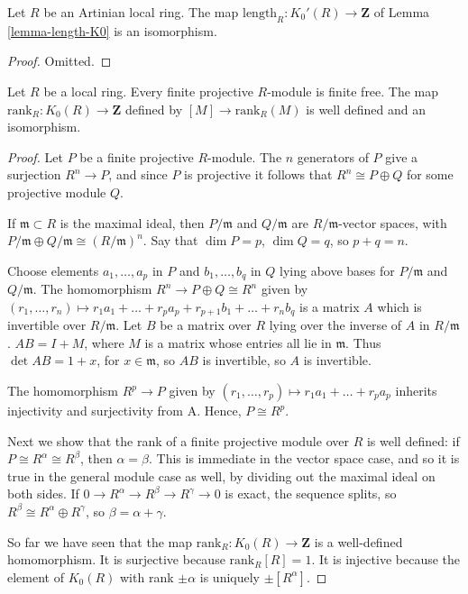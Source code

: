 \begin{lemma}
\label{lemma-K0prime-Artinian}
Let $R$ be an Artinian local ring.
The map $\text{length}_R : K_0'(R) \to \mathbf{Z}$
of Lemma \ref{lemma-length-K0} is an isomorphism.
\end{lemma}

\begin{proof}
Omitted.
\end{proof}

\begin{lemma}
\label{lemma-K0-local}
Let $R$ be a local ring. Every finite projective $R$-module
is finite free. The map $\text{rank}_R : K_0(R) \to \mathbf{Z}$
defined by $[M] \to \text{rank}_R(M)$ is well defined
and an isomorphism.
\end{lemma}

\begin{proof}
Let $P$ be a finite projective $R$-module.
The $n$ generators of $P$ give a surjection
$R^n \to P$, and since $P$ is projective it
follows that $R^n \cong P \oplus Q$ for some
projective module $Q$.

\medskip\noindent
If $\mathfrak m \subset R$ is the maximal ideal,
then $P/\mathfrak m$ and $Q/\mathfrak m$ are $R/\mathfrak m$-vector spaces,
with $P/\mathfrak m \oplus Q/\mathfrak m \cong (R/\mathfrak m)^n$.
Say that $\dim P = p$, $\dim Q = q$, so $p + q = n$.

\medskip\noindent
Choose elements $a_1, \ldots, a_p$ in $P$ and $b_1, \ldots, b_q$ in $Q$
lying above bases for $P/\mathfrak m$ and $Q/\mathfrak m$.
The homomorphism $R^n \to P \oplus Q \cong R^n$ given by
$(r_1, \ldots, r_n) \mapsto
r_1a_1 + \ldots + r_pa_p + r_{p + 1} b_1 + \ldots + r_nb_q$
is a matrix $A$ which is invertible over $R/\mathfrak m$. Let $B$
be a matrix over $R$ lying over the inverse of $A$ in $R/\mathfrak m$.
$AB = I + M$, where $M$ is a matrix whose entries all lie in $\mathfrak m$.
Thus $\det AB = 1 + x$, for $x \in \mathfrak m$, so $AB$ is invertible,
so $A$ is invertible.

\medskip\noindent
The homomorphism $R^p \to P$ given by
$(r_1, \ldots, r_p) \mapsto r_1a_1 + \ldots + r_pa_p$ inherits injectivity and
surjectivity from A. Hence, $P \cong R^p$.

\medskip\noindent
Next we show that the rank of a finite projective module over $R$ is
well defined: if $P \cong R^\alpha \cong R^\beta$, then $\alpha = \beta$.
This is immediate in the vector space case, and so it is true in the
general module case as well, by dividing out the maximal ideal on both sides.
If $0 \to R^\alpha \to R^\beta \to R^\gamma \to 0$
is exact, the sequence splits, so $R^\beta \cong R^\alpha \oplus R^\gamma$,
so $\beta = \alpha + \gamma$.

\medskip\noindent
So far we have seen that the map $\text{rank}_R : K_0(R) \to \mathbf{Z}$
is a well-defined homomorphism. It is surjective because
$\text{rank}_R[R] = 1$. It is injective because the element
of $K_0(R)$ with rank $\pm\alpha$ is uniquely $\pm[R^\alpha]$.
\end{proof}

